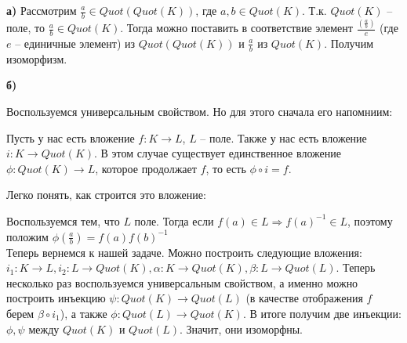 \textbf{а)} Рассмотрим $\frac{a}{b} \in Quot(Quot(K))$, где $a, b \in Quot(K)$. Т.к. $Quot(K)$ -- поле, то $\frac{a}{b} \in Quot(K)$. Тогда можно поставить в соответствие элемент $\frac{(\frac{a}{b})}{e}$ (где $e$ -- единичные элемент) из $Quot(Quot(K))$ и $\frac{a}{b}$ из $Quot(K)$. Получим изоморфизм.

\textbf{б)}

Воспользуемся универсальным свойством. Но для этого сначала его напомниим:

Пусть у нас есть вложение $f: K \to L$, $L$ -- поле. Также у нас есть вложение $i: K \to Quot(K)$. В этом случае существует единственное вложение $\phi: Quot(K) \to L$, которое продолжает $f$, то есть $\phi \circ i = f$.

Легко понять, как строится это вложение:

Воспользуемся тем, что $L$ поле. Тогда если $f(a) \in L \Rightarrow f(a)^{-1} \in L$, поэтому положим $\phi(\frac{a}{b}) = f(a)f(b)^{-1}$\\

Теперь вернемся к нашей задаче. Можно построить следующие вложения: $i_1: K \to L, i_2: L \to Quot(K), \alpha: K \to Quot(K), \beta: L \to Quot(L)$. Теперь несколько раз воспользуемся универсальным свойством, а именно можно построить инъекцию $\psi: Quot(K) \to Quot(L)$ (в качестве отображения $f$ берем $\beta \circ i_1$), а также $\phi: Quot(L) \to Quot(K)$. В итоге получим две инъекции: $\phi, \psi$ между $Quot(K)$ и $Quot(L)$. Значит, они изоморфны.

